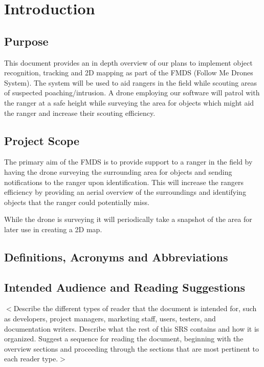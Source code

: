 \chapter{Introduction}

\section{Purpose}
This document provides an in depth overview of our plans to implement object recognition, 
tracking and 2D mapping as part of the FMDS (Follow Me Drones System). 
The system will be used to aid rangers in the field while scouting areas of suspected poaching/intrusion. 
A drone employing our software will patrol with the ranger at a safe height while surveying the area 
for objects which might aid the ranger and increase their scouting efficiency.   

\section{Project Scope}

The primary aim of the FMDS is to provide support to a ranger in the field by having the drone surveying the surrounding area for objects and sending notifications to the ranger upon identification. This will increase the rangers efficiency by providing an aerial overview of the surroundings and identifying objects that the ranger could potentially miss.

While the drone is surveying it will periodically take a snapshot of the area for later use in creating a 2D map. 

\section{Definitions, Acronyms and Abbreviations}


\section{Intended Audience and Reading Suggestions}
$<$Describe the different types of reader that the document is intended for,
such as developers, project managers, marketing staff, users, testers, and
documentation writers. Describe what the rest of this SRS contains and how it is
organized. Suggest a sequence for reading the document, beginning with the
overview sections and proceeding through the sections that are most pertinent to
each reader type.$>$



